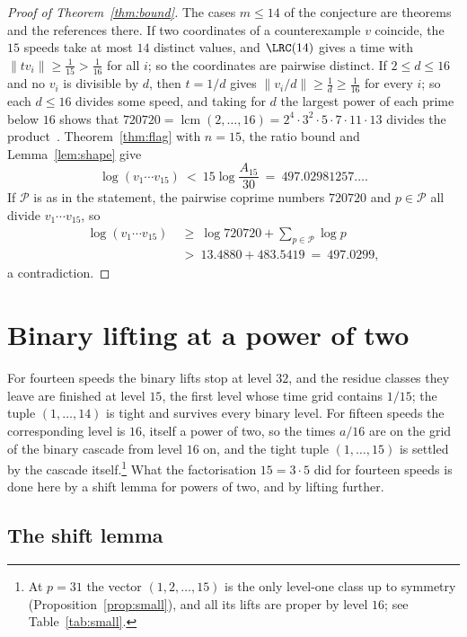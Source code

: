 \begin{proof}[Proof of Theorem~\ref{thm:bound}]
The cases $m\le14$ of the conjecture are theorems~\cite{All26} and the
references there. If two coordinates of a counterexample $v$ coincide, the
$15$ speeds take at most $14$ distinct values, and $\LRC(14)$ gives a time
with $\|tv_i\|\ge\frac1{15}>\frac1{16}$ for all $i$; so the coordinates are
pairwise distinct. If $2\le d\le16$ and no $v_i$ is divisible by $d$, then
$t=1/d$ gives $\|v_i/d\|\ge\frac1d\ge\frac1{16}$ for every $i$; so each
$d\le16$ divides some speed, and taking for $d$ the largest power of each
prime below $16$ shows that
$720720=\operatorname{lcm}(2,\dots,16)=2^4\cdot3^2\cdot5\cdot7\cdot11\cdot13$
divides the product~\cite[Lemma~4]{Ros26a}. Theorem~\ref{thm:flag} with
$n=15$, the ratio bound and Lemma~\ref{lem:shape} give
\[
 \log(v_1\cdots v_{15})\ <\ 15\log\frac{A_{15}}{30}\ =\ 497.02981257\ldots .
\]
If $\mathcal P$ is as in the statement, the pairwise coprime numbers
$720720$ and $p\in\mathcal P$ all divide $v_1\cdots v_{15}$, so
\begin{align*}
 \log(v_1\cdots v_{15})&\ \ge\ \log720720+\sum_{p\in\mathcal P}\log p\\
 &\ >\ 13.4880+483.5419\ =\ 497.0299 ,
\end{align*}
a contradiction.
\end{proof}

\section{Binary lifting at a power of two}\label{sec:binary}

For fourteen speeds the binary lifts stop at level $32$, and the residue
classes they leave are finished at level $15$, the first level whose time grid
contains $1/15$; the tuple $(1,\dots,14)$ is tight and survives every binary
level. For fifteen speeds the corresponding level is $16$, itself a power of
two, so the times $a/16$ are on the grid of the binary cascade from level
$16$ on, and the tight tuple $(1,\dots,15)$ is settled by the cascade
itself.\footnote{At $p=31$ the vector $(1,2,\dots,15)$ is the only level-one
class up to symmetry (Proposition~\ref{prop:small}), and all its lifts are
proper by level $16$; see Table~\ref{tab:small}.} What the factorisation
$15=3\cdot5$ did for fourteen speeds is done here by a shift lemma for powers
of two, and by lifting further.

\subsection{The shift lemma}

